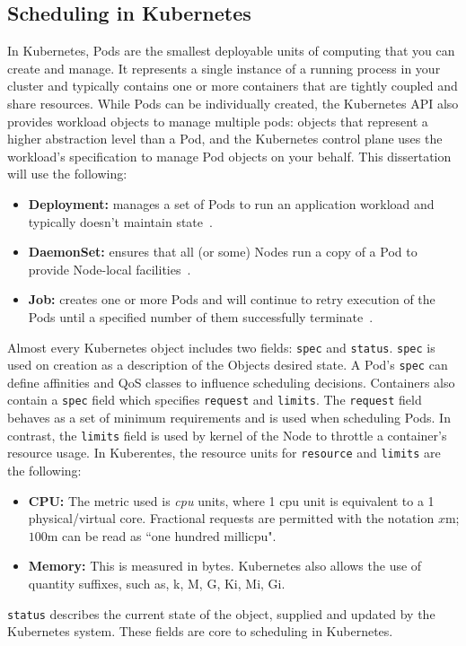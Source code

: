 \subsection{Scheduling in Kubernetes}
In Kubernetes, Pods are the smallest deployable units of computing that you can
create and manage. It represents a single instance of a running
process in your cluster and typically contains one or more containers that are
tightly coupled and share resources. While Pods can be individually created,
the Kubernetes API also provides workload objects to manage multiple pods:
objects that represent a higher abstraction level than a Pod, and the Kubernetes
control plane uses the workload's specification to manage Pod objects on your
behalf. This dissertation will use the following:
\begin{itemize}
    \item \textbf{Deployment:} manages a set of Pods to run an application
        workload and typically doesn't maintain state~\cite{}.
    \item \textbf{DaemonSet:} ensures that all (or some) Nodes run a copy of a
        Pod to provide Node-local facilities~\cite{}.
    \item \textbf{Job:} creates one or more Pods and will continue to retry
        execution of the Pods until a specified number of them successfully
        terminate~\cite{}.
\end{itemize}

Almost every Kubernetes object includes two fields: \verb|spec| and
\verb|status|. \verb|spec| is used on creation as a description of the Objects
desired state. A Pod's \texttt{spec} can define affinities and QoS classes to
influence scheduling decisions. Containers also contain a \verb|spec| field
which specifies \verb|request| and \verb|limits|. The \texttt{request} field
behaves as a set of minimum requirements and is used when scheduling Pods. In
contrast, the \texttt{limits} field is used by kernel of the Node to throttle a
container's resource usage. In Kuberentes, the resource units for
\texttt{resource} and \texttt{limits} are the following:
\begin{itemize}
    \item \textbf{CPU:} The metric used is \textit{cpu} units, where 1 cpu unit
        is equivalent to a 1 physical/virtual core. Fractional requests are
        permitted with the notation $x$m; $100$m can be read as ``one hundred
        millicpu".
    \item \textbf{Memory:} This is measured in bytes. Kubernetes also allows the
        use of quantity suffixes, such as, k, M, G, Ki, Mi, Gi.
\end{itemize}
\texttt{status} describes the current state of the object, supplied and updated
by the Kubernetes system. These fields are core to scheduling in Kubernetes.


